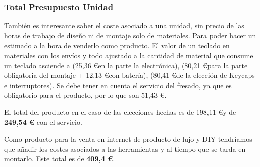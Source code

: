 \subsubsection{Total Presupuesto Unidad}

También es interesante saber el coste asociado a una unidad, sin precio de las horas de trabajo de diseño ni de montaje solo de materiales. Para poder hacer un estimado a la hora de venderlo como producto. El valor de un teclado en materiales con los envíos y todo ajustado a la cantidad de material que consume un teclado asciende a (25,36 \euro en la parte la electrónica), (80,21 \euro para la parte obligatoria del montaje + 12,13 \euro con batería), (80,41 \euro de la elección de \gls{Keycaps} e interruptores). Se debe tener en cuenta el servicio del fresado, ya que es obligatorio para el producto, por lo que son 51,43 \euro.

El total del producto en el caso de las elecciones hechas es de 198,11 \euro y de \textbf{249,54 \euro} con el servicio.

Como producto para la venta en internet de producto de lujo y \gls{DIY} tendríamos que añadir los costes asociados a las herramientas y al tiempo que se tarda en montarlo. Este total es de \textbf{409,4 \euro}.